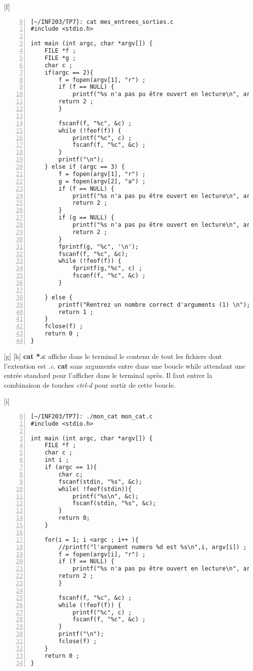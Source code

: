 \documentclass[12pt,a4paper,notitlepage,colorinlistoftodos]{article}
\begin{document}
[f]
\begin{lstlisting}[numbers=left, firstnumber = 0 ]
[~/INF203/TP7]: cat mes_entrees_sorties.c
#include <stdio.h>

int main (int argc, char *argv[]) {
	FILE *f ;
	FILE *g ;
	char c ;
	if(argc == 2){
		f = fopen(argv[1], "r") ;
		if (f == NULL) {
			printf("%s n'a pas pu être ouvert en lecture\n", argv[1]) ;
		return 2 ;
		}
	
		fscanf(f, "%c", &c) ;
		while (!feof(f)) {
			printf("%c", c) ;	
			fscanf(f, "%c", &c) ;
		}
		printf("\n");
	} else if (argc == 3) {
		f = fopen(argv[1], "r") ;
		g = fopen(argv[2], "a") ;
		if (f == NULL) {
			printf("%s n'a pas pu être ouvert en lecture\n", argv[1]) ;
			return 2 ;
		}
		if (g == NULL) {
			printf("%s n'a pas pu être ouvert en lecture\n", argv[2]) ;
			return 2 ;
		}
		fprintf(g, "%c", '\n');
		fscanf(f, "%c", &c);
		while (!feof(f)) {
			fprintf(g,"%c", c) ;	
			fscanf(f, "%c", &c) ;
		}

	} else { 
		printf("Rentrez un nombre correct d'arguments (1) \n");
		return 1 ;
	}
	fclose(f) ;
	return 0 ;
}
\end{lstlisting}

[g] [h]
\textbf{cat *.c} affiche dans le terminal le contenu de tout les fichiers dont l'extention est \textit{.c}.
\textbf{cat} sans arguments entre dans une boucle while attendant une entrée standard pour l'afficher dans le terminal après. 
Il faut entrer la combinaison de touches \textit{ctrl-d} pour sortir de cette boucle.

[i]
\begin{lstlisting}[numbers=left, firstnumber = 0 ]
[~/INF203/TP7]: ./mon_cat mon_cat.c
#include <stdio.h>

int main (int argc, char *argv[]) {
	FILE *f ;
	char c ;
	int i ;
	if (argc == 1){
		char c;
		fscanf(stdin, "%s", &c);
		while( !feof(stdin)){
			printf("%s\n", &c);
			fscanf(stdin, "%s", &c);
		}
		return 0;
	}

	for(i = 1; i <argc ; i++ ){
		//printf("l'argument numero %d est %s\n",i, argv[i]) ;
		f = fopen(argv[i], "r") ;
		if (f == NULL) {
			printf("%s n'a pas pu être ouvert en lecture\n", argv[i]) ;
		return 2 ;
		}
	
		fscanf(f, "%c", &c) ;
		while (!feof(f)) {
			printf("%c", c) ;	
			fscanf(f, "%c", &c) ;
		}
		printf("\n");
		fclose(f) ;
	} 
	return 0 ;
}
\end{lstlisting}
\end{document}
